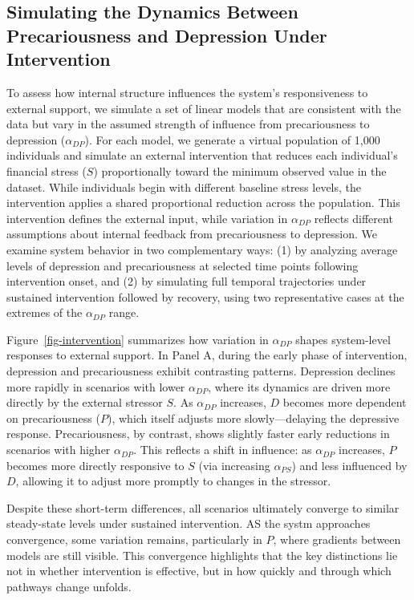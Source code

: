 \documentclass[
]{article}
\begin{document}
\subsection{Simulating the Dynamics Between Precariousness and
Depression Under
Intervention}\label{simulating-the-dynamics-between-precariousness-and-depression-under-intervention}

To assess how internal structure influences the system's responsiveness
to external support, we simulate a set of linear models that are
consistent with the data but vary in the assumed strength of influence
from precariousness to depression (\(\alpha_{DP}\)). For each model, we
generate a virtual population of 1,000 individuals and simulate an
external intervention that reduces each individual's financial stress
(\(S\)) proportionally toward the minimum observed value in the dataset.
While individuals begin with different baseline stress levels, the
intervention applies a shared proportional reduction across the
population. This intervention defines the external input, while
variation in \(\alpha_{DP}\) reflects different assumptions about
internal feedback from precariousness to depression. We examine system
behavior in two complementary ways: (1) by analyzing average levels of
depression and precariousness at selected time points following
intervention onset, and (2) by simulating full temporal trajectories
under sustained intervention followed by recovery, using two
representative cases at the extremes of the \(\alpha_{DP}\) range.

Figure~\ref{fig-intervention} summarizes how variation in
\(\alpha_{DP}\) shapes system-level responses to external support. In
Panel A, during the early phase of intervention, depression and
precariousness exhibit contrasting patterns. Depression declines more
rapidly in scenarios with lower \(\alpha_{DP}\), where its dynamics are
driven more directly by the external stressor \(S\). As \(\alpha_{DP}\)
increases, \(D\) becomes more dependent on precariousness (\(P\)), which
itself adjusts more slowly---delaying the depressive response.
Precariousness, by contrast, shows slightly faster early reductions in
scenarios with higher \(\alpha_{DP}\). This reflects a shift in
influence: as \(\alpha_{DP}\) increases, \(P\) becomes more directly
responsive to \(S\) (via increasing \(\alpha_{PS}\)) and less influenced
by \(D\), allowing it to adjust more promptly to changes in the
stressor.

Despite these short-term differences, all scenarios ultimately converge
to similar steady-state levels under sustained intervention. AS the
systm approaches convergence, some variation remains, particularly in
\(P\), where gradients between models are still visible. This
convergence highlights that the key distinctions lie not in whether
intervention is effective, but in how quickly and through which pathways
change unfolds.
\end{document}
